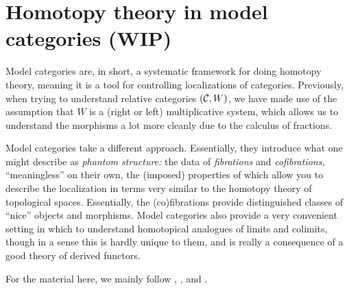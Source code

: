 
\newcommand{\Cof}{\operatorname{Cof}}
\newcommand{\Fib}{\operatorname{Fib}}
\newcommand{\tailto}{\rightarrowtail}
\renewcommand{\simh}{\overset{h}{\sim}}

\section{Homotopy theory in model categories (WIP)}\label{lecture:model categories}

Model categories are, in short, a systematic framework for doing homotopy theory, meaning it is a tool for controlling localizations of categories. Previously, when trying to understand
relative categories \((\mathcal{C},W)\), we have made use of the assumption that \(W\) is a (right or left) multiplicative system, which allows us to understand the morphisms a lot more
cleanly due to the calculus of fractions.

Model categories take a different approach. Essentially, they introduce what one might describe as \emph{phantom structure:} the data of \emph{fibrations} and \emph{cofibrations,}
``meaningless'' on their own, the (imposed) properties of which allow you to describe the localization in terms very similar to the homotopy theory of topological spaces.
Essentially, the (co)fibrations provide distinguished classes of ``nice'' objects and morphisms. Model categories also provide a very convenient setting in which to understand homotopical analogues
of limits and colimits, though in a sense this is hardly unique to them, and is really a consequence of a good theory of derived functors.

For the material here, we mainly follow \cite{riehl-categorical-homotopy-theory}, \cite{cisinski-book}, and \cite{may-ponto-more-concise-algebraic-topology}.

